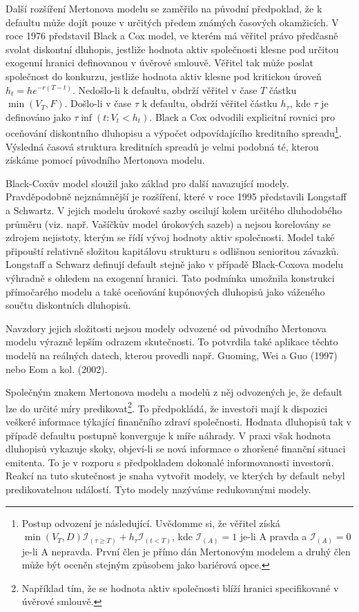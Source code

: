 \documentclass[a4paper]{book}
\begin{document}
Další rozšíření Mertonova modelu se zaměřilo na původní předpoklad, že k defaultu může dojít pouze v určitých předem známých časových okamžicích. V roce 1976 představil Black a Cox model, ve kterém má věřitel právo předčasně svolat diskontní dluhopis, jestliže hodnota aktiv společnosti klesne pod určitou exogenní hranici definovanou v úvěrové smlouvě. Věřitel tak může poslat společnost do konkurzu, jestliže hodnota aktiv klesne pod kritickou úroveň $h_t = h e^{-r(T-t)}$. Nedošlo-li k defaultu, obdrží věřitel v čase $T$ částku $\min(V_T,F)$. Došlo-li v čase $\tau$ k defaultu, obdrží věřitel částku $h_{\tau}$, kde $\tau$ je definováno jako $\tau \inf(t: V_t < h_t)$. Black a Cox odvodili explicitní rovnici pro oceňování diskontního dluhopisu a výpočet odpovídajícího kreditního spreadu\footnote{Postup odvození je následující. Uvědomme si, že věřitel získá $\min(V_T, D){\mathcal{I}_{(\tau \ge T)}} + h_{\tau}{\mathcal{I}_{(t < T)}}$, kde $\mathcal{I}_{(A)} = 1$ je-li A pravda a $\mathcal{I}_{(A)} = 0$ je-li A nepravda. První člen je přímo dán Mertonovým modelem a druhý člen může být oceněn stejným způsobem jako bariérová opce.}. Výsledná časová struktura kreditních spreadů je velmi podobná té, kterou získáme pomocí původního Mertonova modelu.

Black-Coxův model sloužil jako základ pro další navazující modely. Pravděpodobně nejznámnější je rozšíření, které v roce 1995 představili Longstaff a Schwartz. V jejich modelu úrokové sazby oscilují kolem určitého dluhodobého průměru (viz. např. Vašíčkův model úrokových sazeb) a nejsou korelovány se zdrojem nejistoty, kterým se řídí vývoj hodnoty aktiv společnosti. Model také připouští relativně složitou kapitálovu strukturu s odlišnou senioritou závazků. Longstaff a Schwarz definují default stejně jako v případě Black-Coxova modelu výhradně s ohledem na exogenní hranici. Tato podmínka umožnila konstrukci přímočarého modelu a také oceňování kupónových dluhopisů jako váženého součtu diskontních dluhopisů.

Navzdory jejich složitosti nejsou modely odvozené od původního Mertonova modelu výrazně lepším odrazem skutečnosti. To potvrdila také aplikace těchto modelů na reálných datech, kterou provedli např. Guoming, Wei a Guo (1997) nebo Eom a kol. (2002).

Společným znakem Mertonova modelu a modelů z něj odvozených je, že default lze do určité míry predikovat\footnote{Například tím, že se hodnota aktiv společnosti blíží hranici specifikované v úvěrové smlouvě.}. To předpokládá, že investoři mají k dispozici veškeré informace týkající finančního zdraví společnosti. Hodnata dluhopisů tak v případě defaultu postupně konverguje k míře náhrady. V praxi však hodnota dluhopisů vykazuje skoky, objeví-li se nová informace o zhoršené finanční situaci emitenta. To je v rozporu s předpokladem dokonalé informovanosti investorů. Reakcí na tuto skutečnost je snaha vytvořit modely, ve kterých by default nebyl predikovatelnou událostí. Tyto modely nazýváme redukovanými modely.
\end{document}
